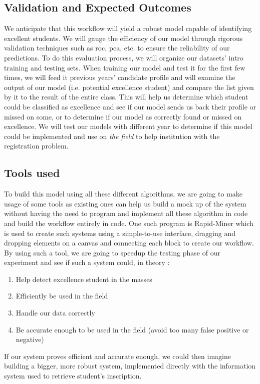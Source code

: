 \documentclass[../main.tex]{subfiles}
\begin{document}
\subsection{Validation and Expected Outcomes}
\label{subsec:concimp_validexcpecoutcomes}
 We anticipate that this workflow will yield a robust model capable of identifying excellent students. We will gauge the efficiency of our model through rigorous validation techniques such as \acrfull{roc}, \acrfull{pca}, etc. to ensure the reliability of our predictions. 
To do this evaluation process, we will organize our datasets' intro training and testing sets. When training our model and test it for the first few times, we will feed it previous years' candidate profile and will examine the output of our model (i.e. potential excellence student) and compare the list given by it to the result of the entire class. This will help us determine which student could be classified as excellence and see if our model sends us back their profile or missed on some, or  to determine if our model as correctly found or missed on excellence.  
We will test our models with different year to determine if this model could be implemented and use on \textit{the field} to help institution with the registration problem.


\subsection{Tools used}
\label{subsec:conimp_tools}
To build this model using all these different algorithms, we are going to make usage of some tools as existing ones can help us build a mock up of the system without having the need to program and implement all these algorithm in code and build the workflow entirely in code. One such program is Rapid-Miner which is used to create such systems using a simple-to-use interface, dragging and dropping elements on a canvas and connecting each block to create our workflow. 
By using such a tool, we are going to speedup the testing phase of our experiment and see if such a system could, in theory :
\begin{enumerate}
    \item Help detect excellence student in the masses
    \item Efficiently be used in the field
    \item Handle our data correctly
    \item Be accurate enough to be used in the field (avoid too many false positive or negative)
\end{enumerate}
If our system proves efficient and accurate enough, we could then imagine building a bigger, more robust system, implemented directly with the information system used to retrieve student's inscription.
\end{document}
